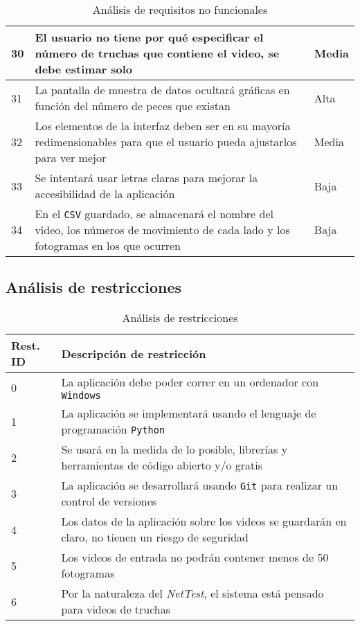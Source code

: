 \begin{table}[H]
\begin{center}
\begin{tabular}{p{} | p{} p{}}
            \hline
            30& El usuario no tiene por qué especificar el número de truchas que contiene el video, se debe estimar solo & Media\\
            \hline
            31& La pantalla de muestra de datos ocultará gráficas en función del número de peces que existan & Alta\\
            \hline
            32& Los elementos de la interfaz deben ser en su mayoría redimensionables para que el usuario pueda ajustarlos para ver mejor & Media\\
            \hline
            33& Se intentará usar letras claras para mejorar la accesibilidad de la aplicación & Baja\\
            \hline
            34& En el \texttt{CSV} guardado, se almacenará el nombre del video, los números de movimiento de cada lado y los fotogramas en los que ocurren & Baja\\
            \hline
        \end{tabular} 
    \end{center}
    \caption{Análisis de requisitos no funcionales}
    \label{ReqNoFuncionales}
\end{table}

\subsection{Análisis de restricciones}

\begin{table}[H]
    \begin{center}
        \begin{tabular}{p{} | p{}}
            Rest. ID & Descripción de restricción\\
            \hline
            0& La aplicación debe poder correr en un ordenador con \texttt{Windows}\\
            \hline
            1& La aplicación se implementará usando el lenguaje de programación \texttt{Python}\\
            \hline
            2& Se usará en la medida de lo posible, librerías y herramientas de código abierto y/o gratis\\
            \hline
            3& La aplicación se desarrollará usando \texttt{Git} para realizar un control de versiones\\
            \hline
            4& Los datos de la aplicación sobre los videos se guardarán en claro, no tienen un riesgo de seguridad\\
            \hline
            5& Los videos de entrada no podrán contener menos de 50 fotogramas\\
            \hline
            6& Por la naturaleza del \textit{NetTest}, el sistema está pensado para videos de truchas\\
            \hline
        \end{tabular} 
    \end{center}
    \caption{Análisis de restricciones}
    \label{Restricciones}
\end{table}